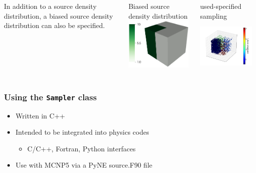 \documentclass[xcolor=x11names,compress]{beamer}
\begin{document}
\begin{frame}
\begin{columns}[T]
\begin{column}{0.3\textwidth}
\vspace{0.6cm}
{\small In addition to a source density distribution, a biased source density distribution can also be specified.}
\end{column}
\begin{column}{0.3\textwidth}
\begin{block}{\tiny Biased source density distribution}
\vspace{0.2cm}
\includegraphics[height=2.5cm]{sampler_bias.png}
\end{block}
\end{column}
\begin{column}{0.3\textwidth}
\begin{block}{\tiny used-specified sampling}
\includegraphics[height=2.7cm]{sample_user.png}
\end{block}
\end{column}
\end{columns}

\end{frame}

\begin{frame}
\frametitle{Using the \texttt{Sampler} class}
\Large
\begin{itemize}
\item{Written in C++}
\item{Intended to be integrated into physics codes}
  \begin{itemize}
    \large
    \item{C/C++, Fortran, Python interfaces}
  \end{itemize}
\item{Use with MCNP5 via a PyNE source.F90 file}
\end{itemize}
\end{frame}
\end{document}
